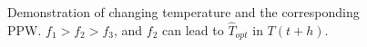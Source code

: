 \begin{figure}[htb]
{\begin{minipage}{.3\linewidth}
\end{minipage}
}
\caption{Demonstration of changing temperature and the corresponding PPW. $f_{1}>f_{2}>f_{3}$, and $f_{2}$ can lead to $\hat{T}_{opt}$ in $T(t+h)$.}
\label{fig:ppw_boost}
\end{figure}

